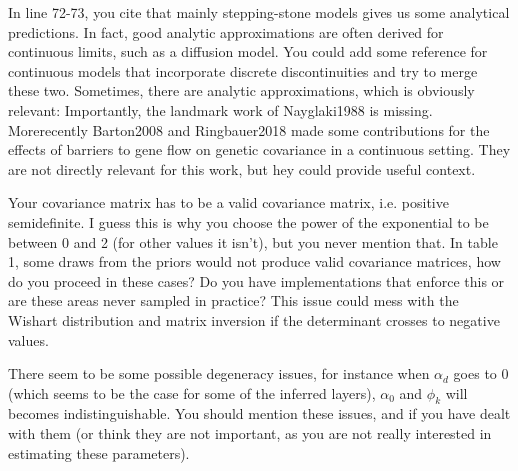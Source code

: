 
\begin{point}{}
    In line 72-73, you cite that mainly stepping-stone models gives us some analytical predictions. 
In fact, good analytic approximations are often derived for continuous limits, such as a diffusion model.
You could add some reference for continuous models that incorporate discrete discontinuities and try to merge these two. 
Sometimes, there are analytic approximations, which is obviously relevant: 
Importantly, the landmark work of Nayglaki1988 is missing. 
Morerecently Barton2008 and Ringbauer2018 made some contributions 
for the effects of barriers to gene flow on genetic covariance in a continuous setting. 
They are not directly relevant for this work, but hey could provide useful context.
\end{point}


\begin{point}{}
    Your covariance matrix has to be a valid covariance matrix, i.e. positive semidefinite. 
I guess this is why you choose the power of the exponential to be between 0 and 2 
(for other values it isn't), but you never mention that. 
In table 1, some draws from the priors would not produce valid covariance matrices, 
how do you proceed in these cases? 
Do you have implementations that enforce this or are these areas never sampled in practice? 
This issue could mess with the Wishart distribution and matrix inversion if the determinant crosses to negative values.
\end{point}


\begin{point}{}
    There seem to be some possible degeneracy issues, 
for instance when $\alpha_d$ goes to 0 (which seems to be the case for some of the inferred layers), 
$\alpha_0$ and $\phi_k$ will becomes indistinguishable.
 You should mention these issues, and if you have dealt with them 
 (or think they are not important, as you are not really interested in estimating these parameters).
\end{point}

